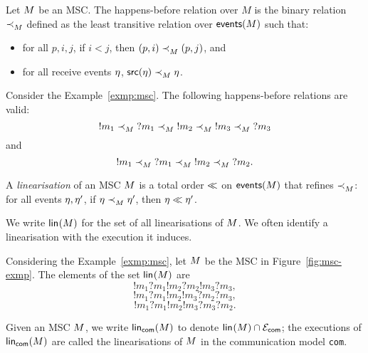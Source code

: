 \bigskip

\begin{definition}
Let $M$ be an MSC. The happens-before relation over $M$
is the binary relation $\mathrel{\prec_{M}^{}}$ defined as 
the least transitive relation over $\mathsf{events}(M)$ such that:
\begin{itemize}
   \item for all 
   $p,i,j$, if $i<j$, then $(p,i)\mathrel{\prec_{M}^{}} (p,j)$, and
   \item for all receive events 
   $\eta$, $\mathsf{src}(\eta) \mathrel{\prec_{M}^{}} \eta$.
\end{itemize}
\end{definition}

\bigskip

\begin{example}
Consider the Example~\ref{exmp:msc}. 
The following happens-before relations are valid:
$${}!m_1{}\mathrel{\prec_{M}^{}} {}?m_1 \mathrel{\prec_{M}^{}} {}!m_2
\mathrel{\prec_{M}^{}} {}!m_3 \mathrel{\prec_{M}^{}} {}?m_3$$
and
$${}!m_1{}\mathrel{\prec_{M}^{}} {}?m_1 \mathrel{\prec_{M}^{}} {}!m_2
\mathrel{\prec_{M}^{}} {}?m_2.$$
\end{example}

\bigskip

\begin{definition}[Linearisation]\label{def:linearisation}
	A \emph{linearisation} of an MSC $M$ is a
	total order $\mathrel{\ll}$ on $\mathsf{events}(M)$
	that refines $\mathrel{\prec_{M}^{}}$:  for all events $\eta,\eta'$, 
	if $\eta\mathrel{\prec_{M}^{}} \eta'$, then $\eta\mathrel{\ll} \eta'$. 
\end{definition}
We write $\mathsf{lin}_{}(M)$ for the set of all linearisations
of $M$. 
We often identify a linearisation with the execution it induces.

\bigskip

\begin{example}\label{exmp:lin}
Considering the Example~\ref{exmp:msc},	
let $M$ be the MSC in Figure~\ref{fig:msc-exmp}. 
The elements of the set $\mathsf{lin}_{}(M)$ are
$$!m_1?m_1!m_2?m_2!m_3?m_3,$$
$$!m_1?m_1!m_2!m_3?m_2?m_3,$$
$$!m_1?m_1!m_2!m_3?m_3?m_2.$$
\end{example}

Given an MSC $M$, we write 
$\mathsf{lin}_{\mathsf{com}}(M)$ to denote
$\mathsf{lin}_{}(M)\cap\mathcal{E}_{\mathsf{com}}$;
the executions of $\mathsf{lin}_{\mathsf{com}}(M)$ 
are called the linearisations of $M$ in the communication 
model \verb|com|.

